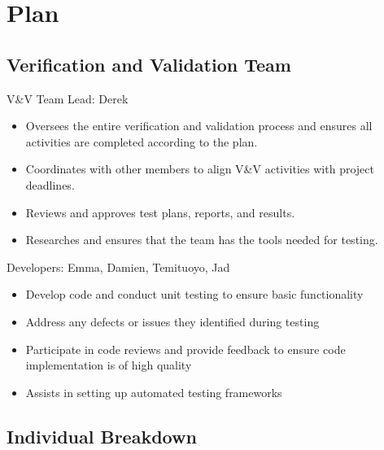 \documentclass[12pt, titlepage]{article}
\begin{document}
\section{Plan}

\subsection{Verification and Validation Team}

V\&V Team Lead: Derek
\begin{itemize}
    \item Oversees the entire verification and validation process and ensures all activities are completed according to the plan.
    \item Coordinates with other members to align V\&V activities with project deadlines.
    \item Reviews and approves test plans, reports, and results.
    \item Researches and ensures that the team has the tools needed for testing.
\end{itemize}

\noindent Developers: Emma, Damien, Temituoyo, Jad
\begin{itemize}
    \item Develop code and conduct unit testing to ensure basic functionality
    \item Address any defects or issues they identified during testing
    \item Participate in code reviews and provide feedback to ensure code implementation is of high quality
    \item Assists in setting up automated testing frameworks
\end{itemize}

\subsection*{Individual Breakdown}
\end{document}
